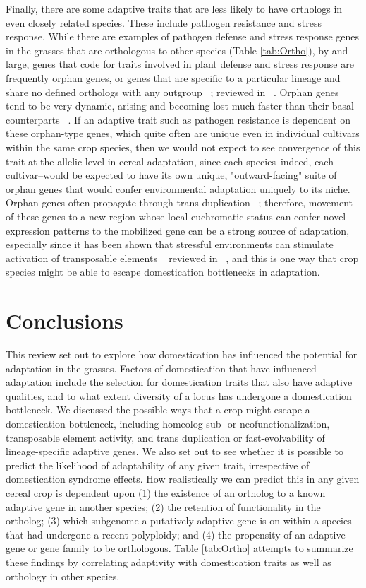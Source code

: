 \documentclass[12pt]{article}
\begin{document}
Finally, there are some adaptive traits that are less likely to have orthologs in even closely related species.
These include pathogen resistance and stress response.
While there are examples of pathogen defense and stress response genes in the grasses that are orthologous to other species (Table \ref{tab:Ortho}), by and large, genes that code for traits involved in plant defense and stress response are frequently orphan genes, or genes that are specific to a particular lineage and share no defined orthologs with any outgroup ~\citep{Woodhouse2011}; reviewed in ~\citep{Arendsee2014}.
Orphan genes tend to be very dynamic, arising and becoming lost much faster than their basal counterparts ~\citep{Freeling2008}.
If an adaptive trait such as pathogen resistance is dependent on these orphan-type genes, which quite often are unique even in individual cultivars within the same crop species, then we would not expect to see convergence of this trait at the allelic level in cereal adaptation, since each species--indeed, each cultivar--would be expected to have its own unique, "outward-facing" suite of orphan genes that would confer environmental adaptation uniquely to its niche.
 Orphan genes often propagate through trans duplication ~\citep{Freeling2008, Arendsee2014}; therefore, movement of these genes to a new region whose local euchromatic status can confer novel expression patterns to the mobilized gene can be a strong source of adaptation, especially since it has been shown that stressful environments can stimulate activation of transposable elements ~\citep{Beguiristain2001, Makarevitch2015}  reviewed in ~\citep{Negi2016}, and this is one way that crop species might be able to escape domestication bottlenecks in adaptation.

\section*{Conclusions}
This review set out to explore how domestication has influenced the potential for adaptation in the grasses.
Factors of domestication that have influenced adaptation include the selection for domestication traits that also have adaptive qualities, and to what extent diversity of a locus has undergone a domestication bottleneck.
We discussed the possible ways that a crop might escape a domestication bottleneck, including homeolog sub- or neofunctionalization, transposable element activity, and trans duplication or fast-evolvability of lineage-specific adaptive genes.
 We also set out to see whether it is possible to predict the likelihood of adaptability of any given trait, irrespective of domestication syndrome effects.
 How realistically we can predict this in any given cereal crop is dependent upon  (1) the existence of an ortholog to a known adaptive gene in another species; (2) the retention of functionality in the ortholog; (3)  which subgenome a putatively adaptive gene is on within a species that had undergone a recent polyploidy; and (4) the propensity of an adaptive gene or gene family to be orthologous.
 Table \ref{tab:Ortho} attempts to summarize these findings by correlating adaptivity with domestication traits as well as orthology in other species.  




\end{document}
